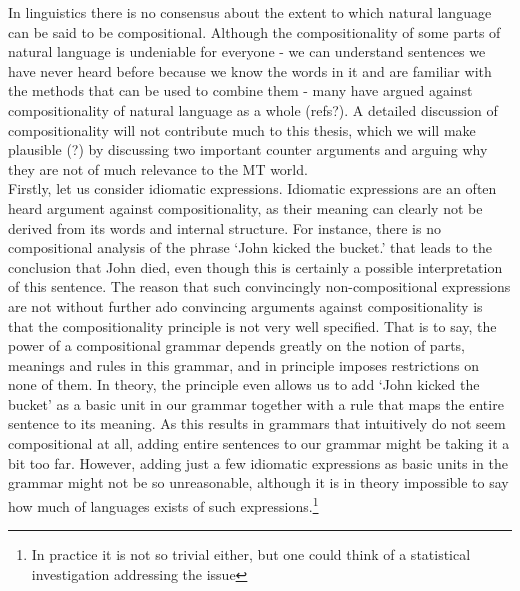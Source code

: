 \documentclass[a4paper, 11pt]{report}
\theoremstyle{definition}
\theoremstyle{plain}
\begin{document}
In linguistics there is no consensus about the extent to which natural language can be said to be compositional. Although the compositionality of some parts of natural language is undeniable for everyone - we can understand sentences we have never heard before because we know the words in it and are familiar with the methods that can be used to combine them - many have argued against compositionality of natural language as a whole (refs?). A detailed discussion of compositionality will not contribute much to this thesis, which we will make plausible (?) by discussing two important counter arguments and arguing why they are not of much relevance to the MT world.\\
Firstly, let us consider idiomatic expressions. Idiomatic expressions are an often heard argument against compositionality, as their meaning can clearly not be derived from its words and internal structure. For instance, there is no compositional analysis of the phrase `John kicked the bucket.' that leads to the conclusion that John died, even though this is certainly a possible interpretation of this sentence. The reason that such convincingly non-compositional expressions are not without further ado convincing arguments against compositionality is that the compositionality principle is not very well specified. That is to say, the power of a compositional grammar depends greatly on the notion of parts, meanings and rules in this grammar, and in principle imposes restrictions on none of them. In theory, the principle even allows us to add `John kicked the bucket' as a basic unit in our grammar together with a rule that maps the entire sentence to its meaning. As this results in grammars that intuitively do not seem compositional at all, adding entire sentences to our grammar might be taking it a bit too far. However, adding just a few idiomatic expressions as basic units in the grammar might not be so unreasonable, although it is in theory impossible to say how much of languages exists of such expressions.\footnote{In practice it is not so trivial either, but one could think of a statistical investigation addressing the issue}\\
\end{document}
